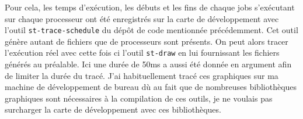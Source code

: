 Pour cela, les temps d'exécution, les débuts et les fins de chaque jobs s'exécutant sur chaque processeur ont été enregistrés sur la carte de développement avec l'outil \texttt{st-trace-schedule} du dépôt de code mentionnée précédemment. Cet outil génère autant de fichiers que de processeurs sont présents. On peut alors tracer l'exécution réel avec cette fois ci l'outil \texttt{st-draw} en lui fournissant les fichiers générés au préalable. Ici une durée de 50ms a aussi été donnée en argument afin de limiter la durée du tracé. J'ai habituellement tracé ces graphiques sur ma machine de développement de bureau dù au fait que de nombreuses bibliothèques graphiques sont nécessaires à la compilation de ces outils, je ne voulais pas surcharger la carte de développement avec ces bibliothèques.